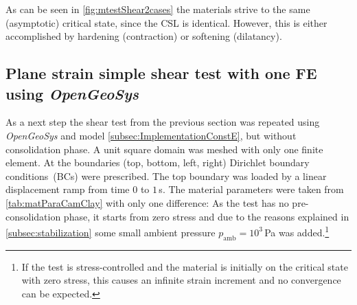 \documentclass[paper=a4, twoside, pagesize]{scrartcl}
\begin{document}
\par
\noindent
As can be seen in \autoref{fig:mtestShear2cases} the materials strive to the same (asymptotic) critical state, since the CSL is identical. However, this is either accomplished by hardening (contraction) or softening (dilatancy).

\subsection{Plane strain simple shear test with one FE using \textsl{OpenGeoSys}}

As a next step the shear test from the previous section was repeated using \textsl{OpenGeoSys} and model \ref{subsec:ImplementationConstE}, but without consolidation phase. A unit square domain was meshed with only one finite element. At the boundaries (top, bottom, left, right) Dirichlet boundary conditions~(BCs) were prescribed. The top boundary was loaded by a linear displacement ramp from time $0$ to $1\,$s. The material parameters were taken from \autoref{tab:matParaCamClay} with only one difference: As the test has no pre-consolidation phase, it starts from zero stress and due to the reasons explained in \autoref{subsec:stabilization} some small ambient pressure $p_\text{amb}=10^{3}$\,Pa was added.\footnote{If the test is stress-controlled and the material is initially on the critical state with zero stress, this causes an infinite strain increment and no convergence can be expected.}
\end{document}
